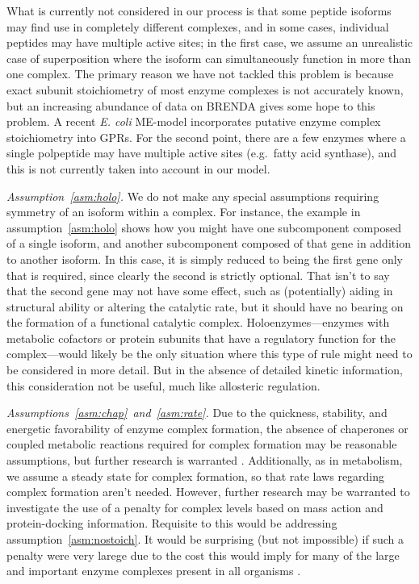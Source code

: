 What is currently not considered in our process is that some peptide
isoforms may find use in completely different complexes, and in some
cases, individual peptides may have multiple active sites; in the
first case, we assume an unrealistic case of superposition where the
isoform can simultaneously function in more than one complex. The
primary reason we have not tackled this problem is because exact
subunit stoichiometry of most enzyme complexes is not accurately
known, but an increasing abundance of data on BRENDA
\citep{Schomburg2013} gives some hope to this problem. A recent
\textit{E. coli} ME-model \citep{O'Brien2013} incorporates putative
enzyme complex stoichiometry into GPRs. For the second point, there
are a few enzymes where a single polpeptide may have multiple active
sites (e.g.\ fatty acid synthase), and this is not currently taken into
account in our model.

\emph{Assumption~\ref{asm:holo}.}
We do not make any special assumptions requiring symmetry of an
isoform within a complex. For instance, the example in
assumption~\ref{asm:holo} shows how you might have one subcomponent
composed of a single isoform, and another subcomponent composed of
that gene in addition to another isoform. In this case, it is simply
reduced to being the first gene only that is required, since clearly
the second is strictly optional. That isn't to say that the second
gene may not have some effect, such as (potentially) aiding in
structural ability or altering the catalytic rate, but it should have
no bearing on the formation of a functional catalytic
complex. Holoenzymes---enzymes with metabolic cofactors or protein
subunits that have a regulatory function for the complex---would
likely be the only situation where this type of rule might need to be
considered in more detail. But in the absence of detailed kinetic
information, this consideration not be useful, much like allosteric
regulation.

\emph{Assumptions~\ref{asm:chap}~and~\ref{asm:rate}.}
Due to the quickness, stability, and energetic favorability of enzyme
complex formation, the absence of chaperones or coupled metabolic
reactions required for complex formation may be reasonable
assumptions, but further research is warranted \citep{Karr2012}.
Additionally, as in metabolism, we assume a steady state for complex
formation, so that rate laws regarding complex formation aren't
needed. However, further research may be warranted to investigate the
use of a penalty for complex levels based on mass action and
protein-docking information. Requisite to this would be addressing
assumption~\ref{asm:nostoich}. It would be surprising (but not
impossible) if such a penalty were very larege due to the cost this
would imply for many of the large and important enzyme complexes
present in all organisms \citep{Nelson2008}.

